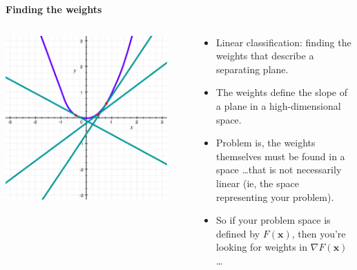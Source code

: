 \documentclass{beamer}
\newcommand{\pagestepalt}[2]{
  \begin{frame}[t]
    \begin{minipage}[t][0.26\textheight][t]{\textwidth}
      \begin{center}
        \huge
        \textbf{#1}
      \end{center}
    \end{minipage}
    
    \begin{minipage}[t][0.7\textheight][c]{\textwidth}
      #2
    \end{minipage}
  \end{frame}
}
\begin{document}
\pagestepalt{Finding the weights}{
  \vspace{-0.2cm}
  \begin{columns}[T]
    \begin{column}{0.49\textwidth}
      \begin{center}
        \includegraphics[width=0.9\textwidth]{quad2.pdf}
      \end{center}
    \end{column}
    \begin{column}{0.49\textwidth}
      \begin{itemize}
      \item Linear classification: finding the weights that describe a
        separating plane.\pause
      \item The weights define the slope of a plane in a
        high-dimensional space.\pause
      \item Problem is, the weights themselves must be found in a
        space \ldots that is not necessarily linear (ie, the space
        representing your problem).\pause
      \item So if your problem space is defined by $F(\mathbf{x})$, then
        you're looking for weights in $\nabla F(\mathbf{x})$\ldots
      \end{itemize}
    \end{column}
  \end{columns}
}
\end{document}
